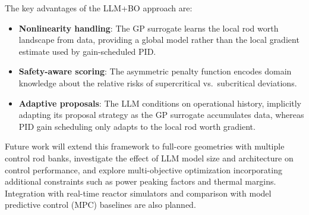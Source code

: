 \documentclass[11pt,twocolumn]{article}
\begin{document}
The key advantages of the LLM+BO approach are:
\begin{itemize}
    \item \textbf{Nonlinearity handling}: The GP surrogate learns the local rod worth landscape from data, providing a global model rather than the local gradient estimate used by gain-scheduled PID.
    \item \textbf{Safety-aware scoring}: The asymmetric penalty function encodes domain knowledge about the relative risks of supercritical vs.\ subcritical deviations.
    \item \textbf{Adaptive proposals}: The LLM conditions on operational history, implicitly adapting its proposal strategy as the GP surrogate accumulates data, whereas PID gain scheduling only adapts to the local rod worth gradient.
\end{itemize}

Future work will extend this framework to full-core geometries with multiple control rod banks, investigate the effect of LLM model size and architecture on control performance, and explore multi-objective optimization incorporating additional constraints such as power peaking factors and thermal margins.
Integration with real-time reactor simulators and comparison with model predictive control (MPC) baselines are also planned.


\end{document}
